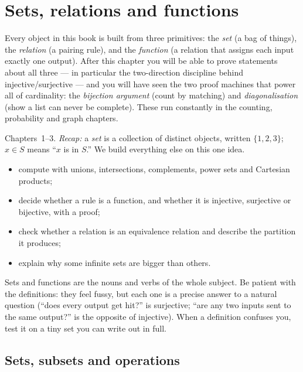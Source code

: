 \chapter{Sets, relations and functions}\label{ch:sets}

Every object in this book is built from three primitives: the \emph{set}
(a bag of things), the \emph{relation} (a pairing rule), and the
\emph{function} (a relation that assigns each input exactly one output).
After this chapter you will be able to prove statements about all three ---
in particular the two-direction discipline behind injective/surjective ---
and you will have seen the two proof machines that power all of cardinality:
the \emph{bijection argument} (count by matching) and \emph{diagonalisation}
(show a list can never be complete). These run constantly in the counting,
probability and graph chapters.

\begin{rulebox}
Chapters~1--3. \emph{Recap:} a \emph{set} is a collection of distinct objects, written $\{1,2,3\}$; $x\in S$ means ``$x$ is in $S$.'' We build everything else on this one idea.
\end{rulebox}
\begin{wins}
\begin{itemize}
\item compute with unions, intersections, complements, power sets and Cartesian products;
\item decide whether a rule is a function, and whether it is injective, surjective or bijective, with a proof;
\item check whether a relation is an equivalence relation and describe the partition it produces;
\item explain why some infinite sets are bigger than others.
\end{itemize}
\end{wins}
\begin{principle}
Sets and functions are the nouns and verbs of the whole subject. Be patient with the definitions: they feel fussy, but each one is a precise answer to a natural question (``does every output get hit?'' is surjective; ``are any two inputs sent to the same output?'' is the opposite of injective). When a definition confuses you, test it on a tiny set you can write out in full.
\end{principle}

\section{Sets, subsets and operations}\label{sec:sets}

